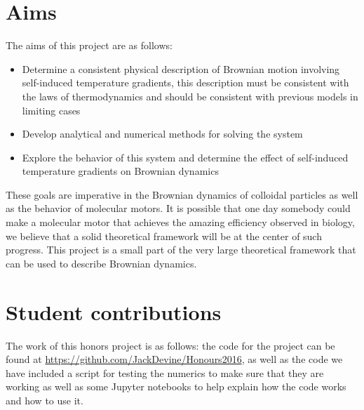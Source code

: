 \section{Aims}
The aims of this project are as follows:
\begin{itemize}
\item{Determine a consistent physical description of Brownian motion involving self-induced temperature gradients, this description must be consistent with the laws of thermodynamics and should be consistent with previous models in limiting cases}
\item{Develop analytical and numerical methods for solving the system}
\item{Explore the behavior of this system and determine the effect of self-induced temperature gradients on Brownian dynamics}
\end{itemize}
These goals are imperative in the Brownian dynamics of colloidal particles as well as the behavior of molecular motors. It is possible that one day somebody could make a molecular motor that achieves the amazing efficiency observed in biology, we believe that a solid theoretical framework will be at the center of such progress. This project is a small part of the very large theoretical framework that can be used to describe Brownian dynamics.
\section{Student contributions}
The work of this honors project is as follows:
the code for the project can be found at \href{url}{https://github.com/JackDevine/Honours2016}, as well as the code we have included a script for testing the numerics to make sure that they are working as well as some Jupyter notebooks to help explain how the code works and how to use it.

